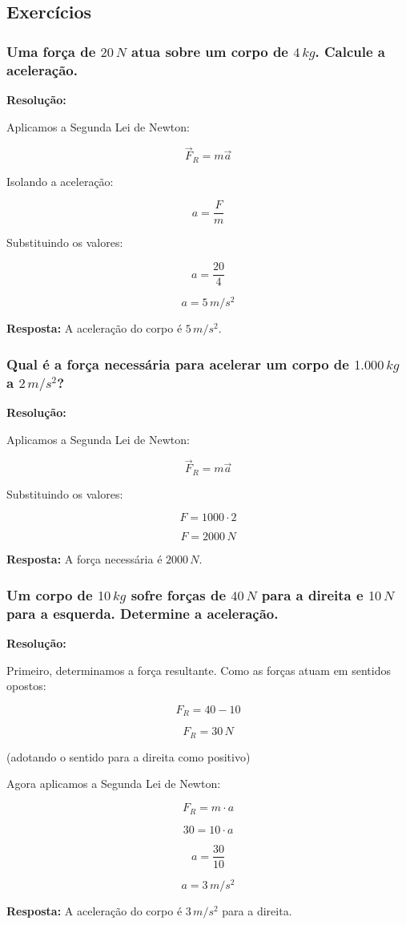 \documentclass[a4paper,12pt]{article}
\begin{document}
\newpage

\subsection{Exercícios}
\subsubsection{Uma força de $20\,N$ atua sobre um corpo de $4\,kg$. Calcule a aceleração.}

{\color{blue}
\textbf{Resolução:}

Aplicamos a Segunda Lei de Newton:

\[
\vec{F}_R = m \vec{a}
\]

Isolando a aceleração:

\[
a = \frac{F}{m}
\]

Substituindo os valores:

\[
a = \frac{20}{4}
\]

\[
a = 5\,m/s^2
\]

\textbf{Resposta:} A aceleração do corpo é $5\,m/s^2$.
}

\newpage

\subsubsection{Qual é a força necessária para acelerar um corpo de $1.000\,kg$ a $2\,m/s^2$?}

{\color{blue}
\textbf{Resolução:}

Aplicamos a Segunda Lei de Newton:

\[
\vec{F}_R = m \vec{a}
\]

Substituindo os valores:

\[
F = 1000 \cdot 2
\]

\[
F = 2000\,N
\]

\textbf{Resposta:} A força necessária é $2000\,N$.
}

\newpage

\subsubsection{Um corpo de $10\,kg$ sofre forças de $40\,N$ para a direita e $10\,N$ para a esquerda. Determine a aceleração.}

{\color{blue}
\textbf{Resolução:}

Primeiro, determinamos a força resultante. Como as forças atuam em sentidos opostos:

\[
F_R = 40 - 10
\]

\[
F_R = 30\,N
\]

(adotando o sentido para a direita como positivo)

Agora aplicamos a Segunda Lei de Newton:

\[
F_R = m \cdot a
\]

\[
30 = 10 \cdot a
\]

\[
a = \frac{30}{10}
\]

\[
a = 3\,m/s^2
\]

\textbf{Resposta:} A aceleração do corpo é $3\,m/s^2$ para a direita.
}
\end{document}
